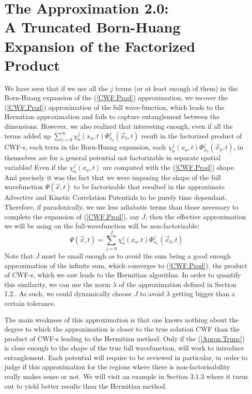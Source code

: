\documentclass[11pt, a4paper]{article} %
\begin{document}
\section{The Approximation 2.0:\\ A Truncated Born-Huang Expansion of the Factorized Product}

We have seen that if we use all the $j$ terms (or at least enough of them) in the Born-Huang expansion of the (\ref{CWF.Prod}) approximation, we recover the (\ref{CWF.Prod}) approximation of the full wave-function, which leads to the Hermitian approximation and fails to capture entanglement between the dimensions. However, we also realized that interesting enough, even if all the terms added up $\sum_{j=0}^\infty \chi_a^j(x_a,t) \Phi_{x_a}^j(\vec{x}_b,t)$ result in the factorized product of CWF-s, each term in the Born-Huang expansion, each $\chi_a^j(x_a,t) \Phi_{x_a}^j(\vec{x}_b,t)$, in themselves are for a general potential not factorizable in separate spatial variables! Even if the $\chi_a^j(x_a,t)$ are computed with the (\ref{CWF.Prod}) shape. And precisely it was the fact that we were imposing the shape of the full wavefunction $\Psi(\vec{x},t)$ to be factorizable that resulted in the approximate Advective and Kinetic Correlation Potentials to be purely time dependant. Therefore, if paradoxically, we use less adiabatic terms than those necessary to complete the expansion of (\ref{CWF.Prod}), say $J$, then the effective approximation we will be using on the full-wavefunction will be non-factorizable:
\begin{equation}\label{Aprox.Trunc}\tag{Aprox.Trunc}
\Psi(\vec{x},t)=\sum_{j=0}^J \chi_a^j(x_a,t) \Phi_{x_a}^j(\vec{x}_b,t)
\end{equation}
Note that $J$ must be small enough as to avoid the sum being a good enough approximation of the infinite sum, which converges to (\ref{CWF.Prod}), the product of CWF-s, which we saw leads to the Hermitian algorithm. In order to quantify this similarity, we can use the norm $\lambda$ of the approximation defined in Section 1.2.. As such, we could dynamically choose $J$ to avoid $\lambda$ getting bigger than a certain tolerance.

The main weakness of this approximation is that one knows nothing about the degree to which the approximation is closer to the true solution CWF than the product of CWF-s leading to the Hermitian method. Only if the (\ref{Aprox.Trunc}) is close enough to the shape of the true full wavefunction, will work to introduce entanglement. Each potential will require to be reviewed in particular, in order to judge if this approximation for the regions where there is non-factorisability really makes sense or not. We will visit an example in Section 3.1.3 where it turns out to yield better results than the Hermitian method.\vspace{-0.3cm}
\end{document}
